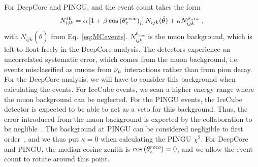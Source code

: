 For DeepCore and PINGU, and the event count takes the form
\begin{align}
    N^\text{th}_{ijk} = \alpha\left[1+\beta \cos{(\theta_z^{reco})}_i \right] N_{ijk}(\hat{\theta}) + \kappa N_{ijk}^{\mu_{atm}}\,,
\end{align}
with $N_{ijk}(\hat{\theta})$ from Eq.~\ref{eq:MCevents}. $N_{ijk}^{\mu_{atm}}$ is the muon background, which is left to float freely in the DeepCore analysis.
The detectors experience an uncorrelated systematic error, which comes from the muon background, 
i.e. events misclassified as muons from 
$\nu_\mu$ interactions rather than from pion decay. For the DeepCore analysis, we will have to consider this background when calculating the events.
For IceCube events, we scan a higher energy range where the muon background can be neglected. For the PINGU events, the IceCube detector is 
expected to be able to act as a veto for this background. Thus, the error introduced from the muon background is expected by the collaboration 
to be neglible~\cite{PINGUletter}.
The background at PINGU can be considered negligible to first order~\cite{PINGUdata}, and we thus put $\kappa=0$ when calculating the PINGU $\chi^2$.
For DeepCore and PINGU, the median cosine-zenith is $\cos{(\theta_z^{reco})} = 0$, and we allow the event count to rotate around this point.

